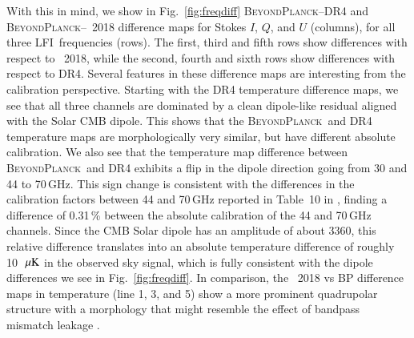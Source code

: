 \documentclass[twocolumn]{aa}
\newcommand{\BP}{\textsc{BeyondPlanck}}
\newcommand{\lfi}[0]{LFI}
\begin{document}
With this in mind, we show in Fig.~\ref{fig:freqdiff} \BP--DR4 and
\BP--\Planck\ 2018 difference maps for Stokes $I$, $Q$, and $U$
(columns), for all three \lfi\ frequencies (rows). The first, third
and fifth rows show differences with respect to \Planck\ 2018, while
the second, fourth and sixth rows show differences with respect to
DR4. Several features in these difference maps are interesting from
the calibration perspective. Starting with the DR4 temperature
difference maps, we see that all three channels are dominated by a
clean dipole-like residual aligned with the Solar CMB dipole. This
shows that the \BP\ and DR4 temperature maps are morphologically
very similar, but have different absolute calibration. We also see
that the temperature map difference between \BP\ and DR4 exhibits
a flip in the dipole direction going from 30 and 44 to 70\,GHz. This
sign change is consistent with the differences in the calibration
factors between 44 and 70\,GHz reported in Table~10 in
\citet{planck2020-LVII}, finding a difference of 0.31\,\% between the
absolute calibration of the 44 and 70\,GHz channels. Since the CMB
Solar dipole has an amplitude of about 3360\muK, this relative
difference translates into an absolute temperature difference of
roughly 10~$\muK$ in the observed sky signal, which is fully
consistent with the dipole differences we see in
Fig.~\ref{fig:freqdiff}. In comparison, the \Planck\ 2018 
vs BP difference maps in temperature (line 1, 3, and 5) show a more prominent
quadrupolar structure with a morphology that might resemble the effect of
bandpass mismatch leakage \citep{planck2014-a12,planck2020-LVII}.
\end{document}
